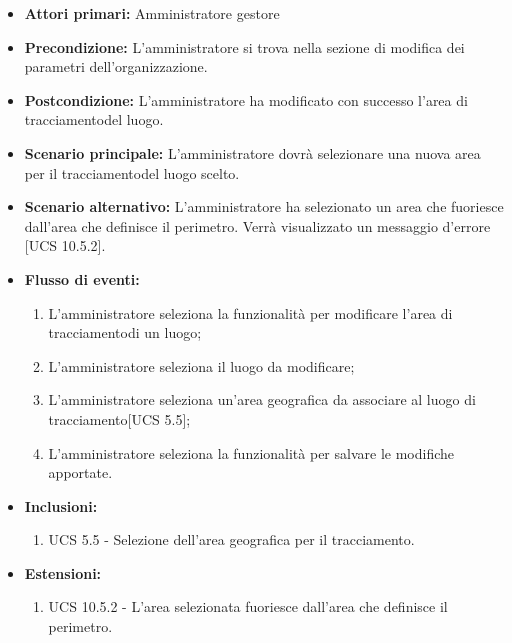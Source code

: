 \begin{itemize}
    \item \textbf{Attori primari:} Amministratore gestore
    \item \textbf{Precondizione:} L'amministratore si trova nella sezione di modifica dei parametri dell'organizzazione.
    \item \textbf{Postcondizione:} L'amministratore ha modificato con successo l'area di tracciamentodel luogo.
    \item \textbf{Scenario principale:} L'amministratore dovrà selezionare una nuova area per il tracciamentodel luogo scelto.
    \item \textbf{Scenario alternativo:} L'amministratore ha selezionato un area che fuoriesce dall'area che definisce il perimetro. Verrà visualizzato un messaggio d'errore [UCS 10.5.2].
    \item \textbf{Flusso di eventi:}
    \begin{enumerate}%
        \item L'amministratore seleziona la funzionalità per modificare l'area di tracciamentodi un luogo;
        \item L'amministratore seleziona il luogo da modificare;
        \item L'amministratore seleziona un'area geografica da associare al luogo di tracciamento[UCS 5.5];
        \item L'amministratore seleziona la funzionalità per salvare le modifiche apportate.
    \end{enumerate}
    \item \textbf{Inclusioni:}
    \begin{enumerate}
        \item UCS 5.5 - Selezione dell'area geografica per il tracciamento.
    \end{enumerate}
    \item \textbf{Estensioni:}
    \begin{enumerate}
        \item UCS 10.5.2 - L'area selezionata fuoriesce dall'area che definisce il perimetro.
    \end{enumerate}
\end{itemize}

